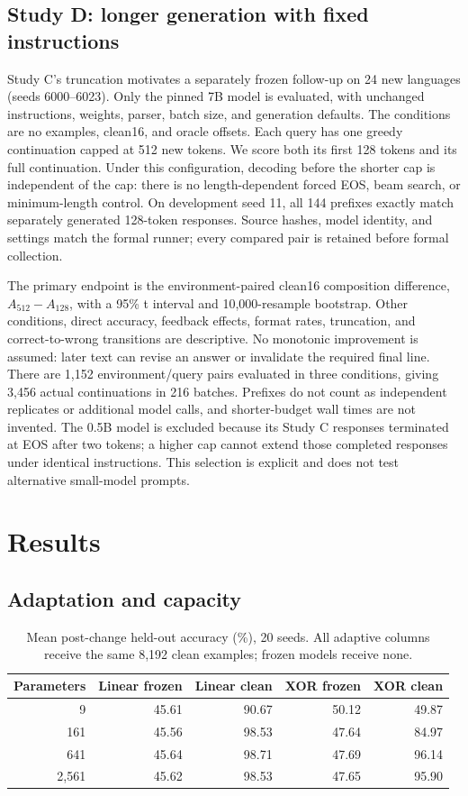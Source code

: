 \documentclass[11pt]{article}
\begin{document}
\subsection{Study D: longer generation with fixed instructions}
Study C's truncation motivates a separately frozen follow-up on 24 new
languages (seeds 6000--6023). Only the pinned 7B model is evaluated, with
unchanged instructions, weights, parser, batch size, and generation defaults.
The conditions are no examples, clean16, and oracle offsets. Each query has
one greedy continuation capped at 512 new tokens. We score both its first
128 tokens and its full continuation. Under this configuration, decoding before
the shorter cap is independent of the cap: there is no length-dependent forced
EOS, beam search, or minimum-length control. On development seed 11, all 144
prefixes exactly match separately generated 128-token responses. Source hashes,
model identity, and settings match the formal runner; every compared pair is
retained before formal collection.

The primary endpoint is the environment-paired clean16 composition difference,
$A_{512}-A_{128}$, with a 95\% t interval and 10,000-resample bootstrap.
Other conditions, direct accuracy, feedback effects, format rates, truncation,
and correct-to-wrong transitions are descriptive. No monotonic improvement is
assumed: later text can revise an answer or invalidate the required final line.
There are 1,152 environment/query pairs evaluated in three conditions, giving
3,456 actual continuations in 216 batches. Prefixes do not count as independent
replicates or additional model calls, and shorter-budget wall times are not
invented. The 0.5B model is excluded because its Study C responses terminated
at EOS after two tokens; a higher cap cannot extend those completed responses
under identical instructions. This selection is explicit and does not test
alternative small-model prompts.

\section{Results}
\subsection{Adaptation and capacity}
\begin{table}[ht]
\centering
\caption{Mean post-change held-out accuracy (\%), 20 seeds. All adaptive
columns receive the same 8,192 clean examples; frozen models receive none.}
\begin{tabular}{r r r r r}
\toprule
Parameters & Linear frozen & Linear clean & XOR frozen & XOR clean\\
\midrule
9 & 45.61 & 90.67 & 50.12 & 49.87\\
161 & 45.56 & 98.53 & 47.64 & 84.97\\
641 & 45.64 & 98.71 & 47.69 & 96.14\\
2,561 & 45.62 & 98.53 & 47.65 & 95.90\\
\bottomrule
\end{tabular}
\end{table}
\end{document}

